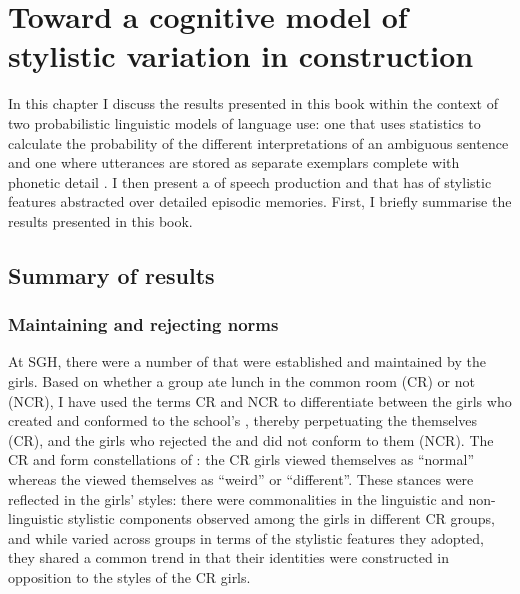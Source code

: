 \chapter{Toward a cognitive model of stylistic variation in  construction}\label{ch:disc}

\date{}


\noindent In this chapter I discuss the results presented in this book within the context of two probabilistic linguistic models of language use: one that uses  statistics to calculate the probability of the different interpretations of an ambiguous sentence \citep{jurafsky1996,narayananjurafsky2002} and one where utterances are stored as separate exemplars complete with phonetic detail \citep{johnson1997,pierrehumbert2001}.  I then present a  of speech production and  that has  of stylistic features abstracted over detailed episodic memories.  First, I briefly summarise the results presented in this book.


\section{Summary of results}
 \subsection{Maintaining and rejecting norms}

At SGH, there were a number of  that were established and maintained by the girls.  Based on whether a group ate lunch in the common room (CR) or not (NCR), I have used the terms CR and NCR to differentiate between the girls who created and conformed to the school's , thereby perpetuating the  themselves (CR), and the girls who rejected the  and did not conform to them (NCR).  The CR and  form constellations of : the CR girls viewed themselves as ``normal'' whereas the  viewed themselves as ``weird'' or ``different''.  These stances were reflected in the girls' styles: there were commonalities in the linguistic and non-linguistic stylistic components observed among the girls in different CR groups, and while  varied across groups in terms of the stylistic features they adopted, they shared a common trend in that their identities were constructed in opposition to the styles of the CR girls.


